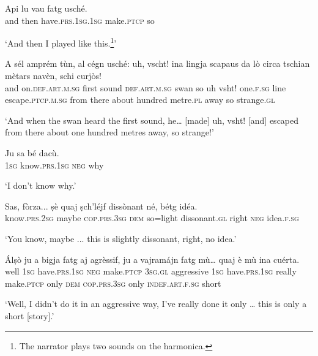 \begin{linenumbers}
\gll  Api lu vau fatg usché.  \\
and then have.\textsc{prs.1sg.1sg} make.\textsc{ptcp} so \\
\end{linenumbers}
\medskip
\glt `And then I played like this.\footnote{The narrator plays two sounds on the harmonica.}'
\medskip

\begin{linenumbers}
\gll  A sél amprém tùn, al cégn usché: uh, vscht! ina lingja scapaus da lò circa tschian mètars navèn, schi curjòs!  \\
and on.\textsc{def.art.m.sg} first sound \textsc{def.art.m.sg} swan so uh vsht! one.\textsc{f.sg} line escape.\textsc{ptcp.m.sg} from there about hundred metre.\textsc{pl} away so strange.\textsc{gl} \\
\end{linenumbers}
\medskip
\glt `And when the swan heard the first sound, he… [made] uh, vsht! [and] escaped from there about one hundred metres away, so strange!'
\medskip

\begin{linenumbers}
\gll Ju sa bé dacù.   \\
 \textsc{1sg} know.\textsc{prs.1sg} \textsc{neg} why \\
\end{linenumbers}
\medskip
\glt `I don’t know why.'
\medskip

\begin{linenumbers}
\gll  Sas, fòrza... ṣè quaj ṣch’léjf dissònant né, bétg idéa.\\
 know.\textsc{prs.2sg} maybe \textsc{cop.prs.3sg} \textsc{dem} so=light  dissonant.\textsc{gl} right \textsc{neg} idea.\textsc{f.sg}\\
\end{linenumbers}
\medskip
\glt `You know, maybe ... this is slightly dissonant, right, no idea.'
\medskip

\begin{linenumbers}
\gll  Álṣò ju a bigja fatg aj agrèssif, ju a vajramájn fatg mù…  quaj è mù ina cuérta.  \\
well \textsc{1sg} have.\textsc{prs.1sg} \textsc{neg} make.\textsc{ptcp} \textsc{3sg.gl} aggressive \textsc{1sg} have.\textsc{prs.1sg} really make.\textsc{ptcp} only  \textsc{dem} \textsc{cop.prs.3sg} only \textsc{indef.art.f.sg} short \\
\end{linenumbers}
\medskip
\glt `Well, I didn’t do it in an aggressive way, I’ve really done it only … this is only a short [story].'
\medskip



